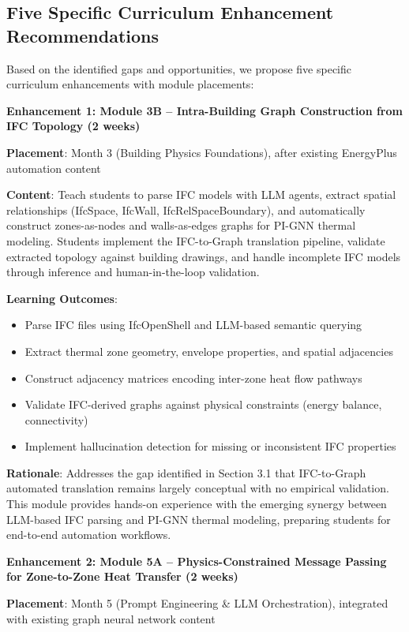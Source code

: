 \documentclass[12pt,a4paper]{article}
\begin{document}
\subsection{Five Specific Curriculum Enhancement Recommendations}

Based on the identified gaps and opportunities, we propose five specific curriculum enhancements with module placements:

\textbf{Enhancement 1: Module 3B -- Intra-Building Graph Construction from IFC Topology (2 weeks)}

\textbf{Placement}: Month 3 (Building Physics Foundations), after existing EnergyPlus automation content

\textbf{Content}: Teach students to parse IFC models with LLM agents, extract spatial relationships (IfcSpace, IfcWall, IfcRelSpaceBoundary), and automatically construct zones-as-nodes and walls-as-edges graphs for PI-GNN thermal modeling. Students implement the IFC-to-Graph translation pipeline, validate extracted topology against building drawings, and handle incomplete IFC models through inference and human-in-the-loop validation.

\textbf{Learning Outcomes}:
\begin{itemize}
  \item Parse IFC files using IfcOpenShell and LLM-based semantic querying
  \item Extract thermal zone geometry, envelope properties, and spatial adjacencies
  \item Construct adjacency matrices encoding inter-zone heat flow pathways
  \item Validate IFC-derived graphs against physical constraints (energy balance, connectivity)
  \item Implement hallucination detection for missing or inconsistent IFC properties
\end{itemize}

\textbf{Rationale}: Addresses the gap identified in Section 3.1 that IFC-to-Graph automated translation remains largely conceptual with no empirical validation. This module provides hands-on experience with the emerging synergy between LLM-based IFC parsing and PI-GNN thermal modeling, preparing students for end-to-end automation workflows.

\textbf{Enhancement 2: Module 5A -- Physics-Constrained Message Passing for Zone-to-Zone Heat Transfer (2 weeks)}

\textbf{Placement}: Month 5 (Prompt Engineering \& LLM Orchestration), integrated with existing graph neural network content
\end{document}
